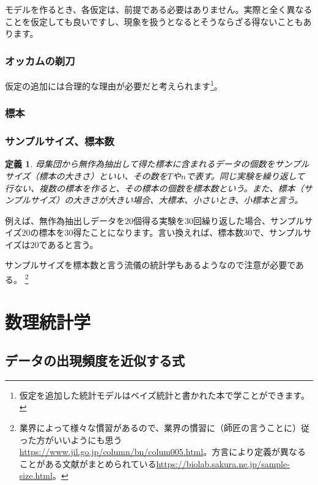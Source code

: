 \documentclass[a4paper,11pt,dvipdfmx]{jsarticle}
\newtheorem{defi}{定義}[section]
\begin{document}
モデルを作るとき、各仮定は、前提である必要はありません。実際と全く異なることを仮定しても良いですし、現象を扱うとなるとそうならざる得ないこともあります。
\subsubsection{オッカムの剃刀}

仮定の追加には合理的な理由が必要だと考えられます\footnote{仮定を追加した統計モデルはベイズ統計と書かれた本で学ことができます。}。

\begin{figure}
    \begin{center}
%
\end{center}
\end{figure}

\subsubsection{標本}


\subsubsection{サンプルサイズ、標本数}
\begin{defi}
母集団から無作為抽出して得た標本に含まれるデータの個数をサンプルサイズ（標本の大きさ）といい、その数を$T$や$n$で表す。同じ実験を繰り返して行ない、複数の標本を作ると、その標本の個数を標本数という。また、標本（サンプルサイズ）の大きさが大きい場合、大標本、小さいとき、小標本と言う。
\end{defi}
例えば、無作為抽出しデータを$20$個得る実験を30回繰り返した場合、サンプルサイズ$20$の標本を$30$得たことになります。言い換えれば、標本数$30$で、サンプルサイズは$20$であると言う。

サンプルサイズを標本数と言う流儀の統計学もあるようなので注意が必要である。
\footnote{ 業界によって様々な慣習があるので、業界の慣習に（師匠の言うことに）従った方がいいようにも思う\url{https://www.jil.go.jp/column/bn/colum005.html}。方言により定義が異なることがある文献がまとめられている\url{https://biolab.sakura.ne.jp/sample-size.html}。}

\section{数理統計学 }
\subsection{データの出現頻度を近似する式}
\end{document}

